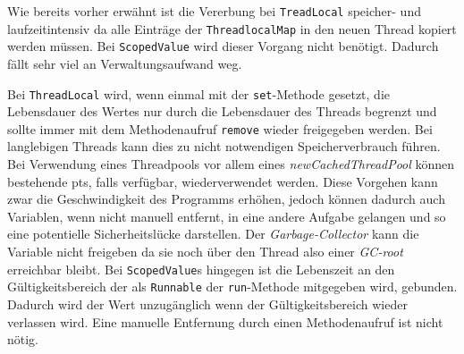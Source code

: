     Wie bereits vorher erwähnt ist die Vererbung bei \texttt{TreadLocal} speicher- und laufzeitintensiv da alle Einträge der \texttt{ThreadlocalMap} in den neuen Thread kopiert werden müssen.
    Bei \texttt{ScopedValue} wird dieser Vorgang nicht benötigt. Dadurch fällt sehr viel an Verwaltungsaufwand weg. 

    Bei \texttt{ThreadLocal} wird, wenn einmal mit der \texttt{set}-Methode gesetzt, die Lebensdauer des Wertes nur durch die Lebensdauer des Threads begrenzt und sollte immer mit dem Methodenaufruf
    \texttt{remove} wieder freigegeben werden. Bei langlebigen Threads kann dies zu nicht notwendigen Speicherverbrauch führen. Bei Verwendung eines Threadpools vor allem eines \emph{newCachedThreadPool}
    können bestehende \Glspl{pt}, falls verfügbar, wiederverwendet werden. Diese Vorgehen kann zwar die Geschwindigkeit des Programms erhöhen, jedoch können dadurch auch Variablen,
    wenn nicht manuell entfernt, in eine andere Aufgabe gelangen und so eine potentielle Sicherheitslücke darstellen. Der \emph{Garbage-Collector} kann die Variable nicht freigeben da sie noch über 
    den Thread also einer \emph{GC-root} erreichbar bleibt. Bei \texttt{ScopedValue}s hingegen ist die Lebenszeit an den Gültigkeitsbereich der als \texttt{Runnable} der \texttt{run}-Methode mitgegeben wird,
    gebunden. Dadurch wird der Wert unzugänglich wenn der Gültigkeitsbereich wieder verlassen wird. Eine manuelle Entfernung durch einen Methodenaufruf ist nicht nötig.

